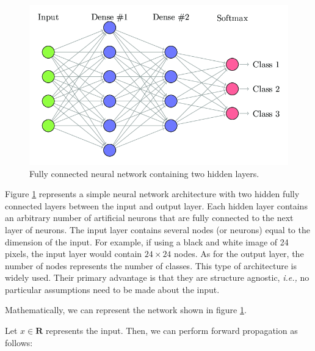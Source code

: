\begin{figure}[t]
    \includegraphics[clip,width=1\columnwidth]{Figures/related/fcnn.png}
    \caption{ Fully connected neural network containing two hidden layers. }
    \label{fig:fcnn}
\end{figure}


Figure \ref{fig:fcnn} represents a simple neural network architecture with two
hidden fully connected layers between the input and output layer. Each hidden
layer contains an arbitrary number of artificial neurons that are fully
connected to the next layer of neurons. The input layer contains several nodes
(or neurons) equal to the dimension of the input. For example, if using a black
and white image of 24 pixels, the input layer would contain $24 \times 24$
nodes. As for the output layer, the number of nodes represents the number of
classes. This type of architecture is widely used. Their primary advantage is
that they are structure agnostic, \emph{i.e.,} no particular assumptions need to
be made about the input.

Mathematically, we can represent the network shown in figure \ref{fig:fcnn}.

Let $x \in \mathbf{R}$ represents the input. Then, we can perform forward
propagation as follows:


